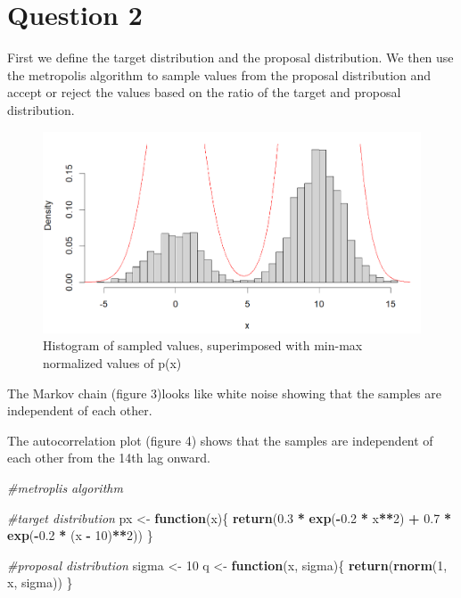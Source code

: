 \documentclass[
]{article}
\newenvironment{Shaded}{\begin{snugshade}}{\end{snugshade}}
\newcommand{\CommentTok}[1]{\textcolor[rgb]{0.56,0.35,0.01}{\textit{#1}}}
\newcommand{\ControlFlowTok}[1]{\textcolor[rgb]{0.13,0.29,0.53}{\textbf{#1}}}
\newcommand{\DecValTok}[1]{\textcolor[rgb]{0.00,0.00,0.81}{#1}}
\newcommand{\FloatTok}[1]{\textcolor[rgb]{0.00,0.00,0.81}{#1}}
\newcommand{\FunctionTok}[1]{\textcolor[rgb]{0.13,0.29,0.53}{\textbf{#1}}}
\newcommand{\NormalTok}[1]{#1}
\newcommand{\OtherTok}[1]{\textcolor[rgb]{0.56,0.35,0.01}{#1}}
\newcommand{\SpecialCharTok}[1]{\textcolor[rgb]{0.81,0.36,0.00}{\textbf{#1}}}
\begin{document}
\hypertarget{question-2}{%
\section{Question 2}\label{question-2}}

First we define the target distribution and the proposal distribution.
We then use the metropolis algorithm to sample values from the proposal
distribution and accept or reject the values based on the ratio of the
target and proposal distribution.

\begin{figure}
\centering
\includegraphics[width=5.58333in,height=\textheight]{qtn2.png}
\caption{Histogram of sampled values, superimposed with min-max
normalized values of p(x)}
\end{figure}

The Markov chain (figure 3)looks like white noise showing that the
samples are independent of each other.

The autocorrelation plot (figure 4) shows that the samples are
independent of each other from the 14th lag onward.

\begin{Shaded}
\begin{Highlighting}[]
\CommentTok{\#metroplis algorithm}

\CommentTok{\#target distribution}
\NormalTok{px }\OtherTok{\textless{}{-}} \ControlFlowTok{function}\NormalTok{(x)\{}
  \FunctionTok{return}\NormalTok{(}\FloatTok{0.3} \SpecialCharTok{*} \FunctionTok{exp}\NormalTok{(}\SpecialCharTok{{-}}\FloatTok{0.2} \SpecialCharTok{*}\NormalTok{ x}\SpecialCharTok{**}\DecValTok{2}\NormalTok{) }\SpecialCharTok{+} \FloatTok{0.7} \SpecialCharTok{*} \FunctionTok{exp}\NormalTok{(}\SpecialCharTok{{-}}\FloatTok{0.2} \SpecialCharTok{*}\NormalTok{ (x }\SpecialCharTok{{-}} \DecValTok{10}\NormalTok{)}\SpecialCharTok{**}\DecValTok{2}\NormalTok{))}
\NormalTok{\}}

\CommentTok{\#proposal distribution}
\NormalTok{sigma }\OtherTok{\textless{}{-}} \DecValTok{10}
\NormalTok{q }\OtherTok{\textless{}{-}} \ControlFlowTok{function}\NormalTok{(x, sigma)\{}
  \FunctionTok{return}\NormalTok{(}\FunctionTok{rnorm}\NormalTok{(}\DecValTok{1}\NormalTok{, x, sigma))}
\NormalTok{\}}
\end{Highlighting}
\end{Shaded}
\end{document}
